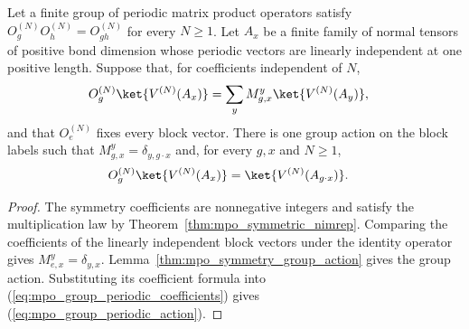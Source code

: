 \begin{corollary}%
    \label{thm:mpo_symmetry_group_periodic_action}
    \leanok
    Let a finite group of periodic matrix product operators satisfy
    $O_g^{(N)}O_h^{(N)}=O_{gh}^{(N)}$ for every $N\geq1$.
    Let $A_x$ be a finite family of normal tensors of positive bond
    dimension whose periodic vectors are linearly independent at one
    positive length. Suppose that, for coefficients independent of $N$,
    \begin{align}
        O_g^{(N)}\ket{V^{(N)}(A_x)}
         & =\sum_y M_{g,x}^y\ket{V^{(N)}(A_y)},
        \label{eq:mpo_group_periodic_coefficients}
    \end{align}
    and that $O_e^{(N)}$ fixes every block vector. There is one group
    action on the block labels such that $M_{g,x}^y=\delta_{y,g\cdot x}$
    and, for every $g,x$ and $N\geq1$,
    \begin{align}
        O_g^{(N)}\ket{V^{(N)}(A_x)}
         & =\ket{V^{(N)}(A_{g\cdot x})}.
        \label{eq:mpo_group_periodic_action}
    \end{align}
\end{corollary}

\begin{proof}
    \leanok
    The symmetry coefficients are nonnegative integers and satisfy the
    multiplication law by Theorem~\ref{thm:mpo_symmetric_nimrep}.
    Comparing the coefficients of the linearly independent block vectors
    under the identity operator gives $M_{e,x}^y=\delta_{y,x}$.
    Lemma~\ref{thm:mpo_symmetry_group_action} gives the group action.
    Substituting its coefficient formula into
    (\ref{eq:mpo_group_periodic_coefficients}) gives
    (\ref{eq:mpo_group_periodic_action}).
\end{proof}
